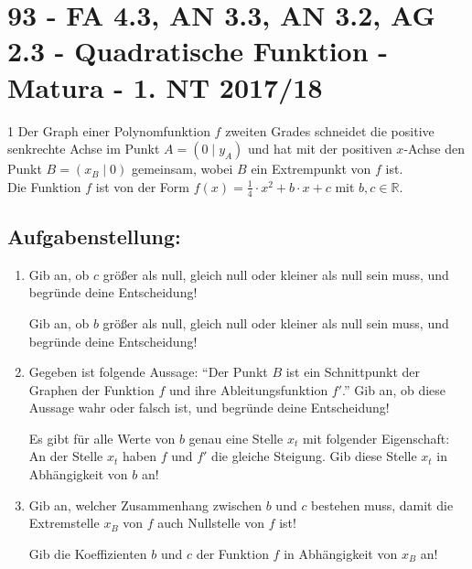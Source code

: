 \section{93 - FA 4.3, AN 3.3, AN 3.2, AG 2.3 - Quadratische Funktion - Matura - 1. NT 2017/18}

\begin{langesbeispiel} \item[1] %
Der Graph einer Polynomfunktion $f$ zweiten Grades schneidet die positive senkrechte Achse im Punkt $A=(0\mid y_A)$ und hat mit der positiven $x$-Achse den Punkt $B=(x_B\mid 0)$ gemeinsam, wobei $B$ ein Extrempunkt von $f$ ist.\\
Die Funktion $f$ ist von der Form $f(x)=\frac{1}{4}\cdot x^2+b\cdot x+c$ mit $b,c\in\mathbb{R}$.

\subsection{Aufgabenstellung:}
\begin{enumerate}
	\item {} Gib an, ob $c$ größer als null, gleich null oder kleiner als null sein muss, und begründe deine Entscheidung!
	
	Gib an, ob $b$ größer als null, gleich null oder kleiner als null sein muss, und begründe deine Entscheidung!
	
	\item Gegeben ist folgende Aussage: "`Der Punkt $B$ ist ein Schnittpunkt der Graphen der Funktion $f$ und ihre Ableitungsfunktion $f'$."' Gib an, ob diese Aussage wahr oder falsch ist, und begründe deine Entscheidung!
	
	Es gibt für alle Werte von $b$ genau eine Stelle $x_t$ mit folgender Eigenschaft: An der Stelle $x_t$ haben $f$ und $f'$ die gleiche Steigung. Gib diese Stelle $x_t$ in Abhängigkeit von $b$ an!
	
	\item Gib an, welcher Zusammenhang zwischen $b$ und $c$ bestehen muss, damit die Extremstelle $x_B$ von $f$ auch Nullstelle von $f$ ist!
	
	Gib die Koeffizienten $b$ und $c$ der Funktion $f$ in Abhängigkeit von $x_B$ an!		
\end{enumerate}

\end{langesbeispiel}
